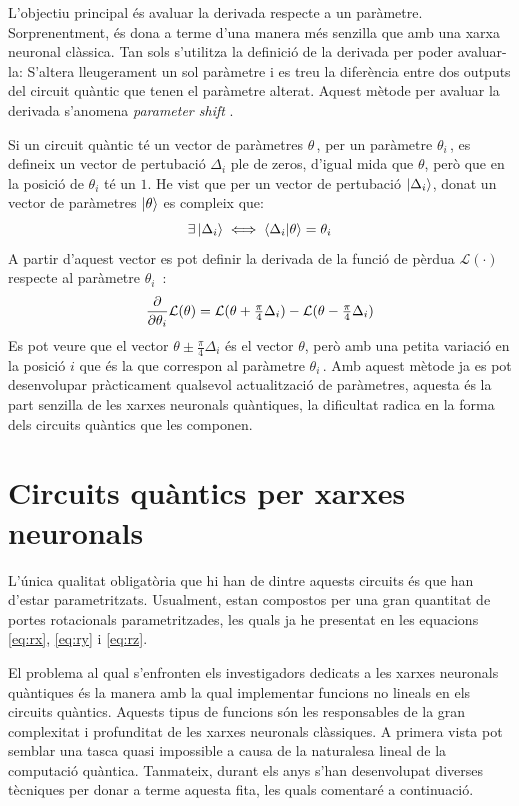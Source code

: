 L'objectiu principal és avaluar la derivada respecte a un paràmetre. Sorprenentment, és dona a terme d'una manera més senzilla que amb una xarxa neuronal clàssica. Tan sols s'utilitza la definició de la derivada per poder avaluar-la: S'altera lleugerament un sol paràmetre i es treu la diferència entre dos outputs del circuit quàntic que tenen el paràmetre alterat. Aquest mètode per avaluar la derivada s'anomena \textit{parameter shift} \cite{tfq, shift_parameter_harrow_2019}.

Si un circuit quàntic té un vector de paràmetres $\theta\,$, per un paràmetre $\theta_{i}\,$, es defineix un vector de pertubació $\Delta_i$ ple de zeros, d'igual mida que $\theta$, però que en la posició de $\theta_i$ té un $1$. He vist que per un vector de pertubació $\ket{\Delta_{i}}$, donat un vector de paràmetres $\ket{\theta}$ es compleix que:
\begin{equation*}
	\exists \ket{\Delta_{i}} \iff \bra{\Delta_{i}}\ket{\theta} = \theta_i
\end{equation*}
A partir d'aquest vector es pot definir la derivada de la funció de pèrdua $\mathcal{L}(\cdot)$ respecte al paràmetre $\theta_{i}\,$ \cite{tfq}:
$$
\pdv{\theta_i} \mathcal{L}(\theta) = \mathcal{L}(\theta + \tfrac{\pi}{4}\Delta_i) - \mathcal{L}(\theta - \tfrac{\pi}{4}\Delta_i)
$$
Es pot veure que el vector $\theta \pm \frac{\pi}{4}\Delta_i$ és el vector $\theta$, però amb una petita variació en la posició $i$ que és la que correspon al paràmetre $\theta_i\,$. Amb aquest mètode ja es pot desenvolupar pràcticament qualsevol actualització de paràmetres, aquesta és la part senzilla de les xarxes neuronals quàntiques, la dificultat radica en la forma dels circuits quàntics que les componen.

\section{Circuits quàntics per xarxes neuronals}
\label{qcircuits}
L'única qualitat obligatòria que hi han de dintre aquests circuits és que han d'estar parametritzats. Usualment, estan compostos per una gran quantitat de portes rotacionals parametritzades, les quals ja he presentat en les equacions \ref{eq:rx}, \ref{eq:ry} i \ref{eq:rz}.

El problema al qual s'enfronten els investigadors dedicats a les xarxes neuronals quàntiques és la manera amb la qual implementar funcions no lineals en els circuits quàntics. Aquests tipus de funcions són les responsables de la gran complexitat i profunditat de les xarxes neuronals clàssiques. A primera vista pot semblar una tasca quasi impossible a causa de la naturalesa lineal de la computació quàntica. Tanmateix, durant els anys s'han desenvolupat diverses tècniques per donar a terme aquesta fita, les quals comentaré a continuació.

